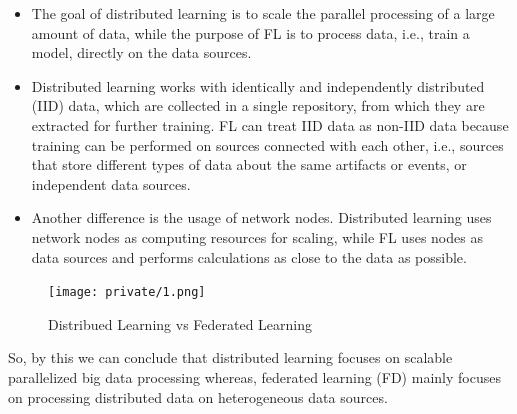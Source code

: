 \documentclass[14pt]{extarticle}
\begin{document}
\begin {itemize}
    \item \par The goal of distributed learning is to scale the parallel processing of a large amount of data, while the purpose of FL is to process data, i.e., train a model, directly on the data sources.
    \item \par Distributed learning works with identically and independently distributed (IID) data, which are collected in a single repository, from which they are extracted for further training. FL can treat IID data as non-IID data because training can be performed on sources connected with each other, i.e., sources that store different types of data about the same artifacts or events, or independent data sources.
    \item \par Another difference is the usage of network nodes. Distributed learning uses network nodes as computing resources for scaling, while FL uses nodes as data sources and performs calculations as close to the data as possible.
\end{itemize}

\begin{figure}[!h]
    \centering
    \texttt{[image: private/1.png]}
    \caption{Distribued Learning vs Federated Learning}
    \label{fig:dlVSfl}
\end{figure}

\par So, by this we can conclude that distributed learning focuses on scalable parallelized big data processing whereas, federated learning (FD) mainly focuses on processing distributed data on heterogeneous data sources.

\newpage
\end{document}
